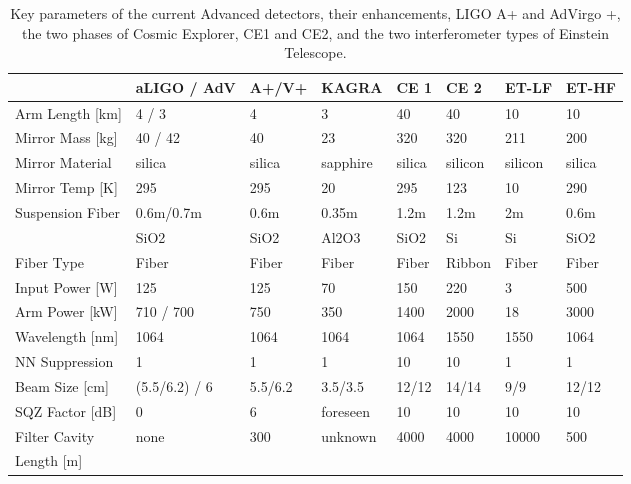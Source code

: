 \begin{table}[h]
\centering
\begin{tabular}{|l|l|l|p{1.6cm}|l|l|l|l|}
\hline
 &aLIGO / AdV &A+/V+ &KAGRA &CE 1 &CE 2 &ET-LF &ET-HF\\
\hline
Arm Length [km] & 4 / 3 &4& 3& 40& 40& 10 &10\\
\hline
Mirror Mass [kg]& 40 / 42& 40& 23& 320& 320& 211& 200\\
\hline
Mirror Material& silica& silica& sapphire& silica& silicon& silicon& silica\\
\hline
Mirror Temp [K]& 295& 295& 20& 295& 123& 10& 290\\
\hline
Suspension Fiber& 0.6m/0.7m& 0.6m& 0.35m& 1.2m& 1.2m& 2m& 0.6m\\
& SiO2& SiO2&Al2O3&SiO2&Si&Si&SiO2\\
\hline
Fiber Type& Fiber& Fiber& Fiber& Fiber& Ribbon& Fiber& Fiber\\
\hline
Input Power [W]& 125& 125& 70& 150& 220& 3& 500\\
\hline
Arm Power [kW]& 710 / 700& 750& 350& 1400& 2000& 18& 3000\\
\hline
Wavelength [nm]& 1064& 1064& 1064& 1064& 1550& 1550& 1064\\
\hline
NN Suppression& 1& 1& 1& 10& 10& 1& 1\\
\hline
Beam Size [cm]& (5.5/6.2) / 6& 5.5/6.2& 3.5/3.5& 12/12& 14/14& 9/9& 12/12\\
\hline
SQZ Factor [dB]& 0& 6& foreseen& 10& 10& 10& 10\\
\hline
Filter Cavity & none& 300& unknown& 4000& 4000& 10000& 500\\
Length [m] &&&&&&&\\
\hline
\end{tabular}
\caption{Key parameters of the current Advanced detectors, their enhancements, LIGO A+ and AdVirgo +, the two phases of Cosmic Explorer, CE1 and CE2, and the two interferometer types of Einstein Telescope.}
\label{Tab:FutIfos}
\end{table}
